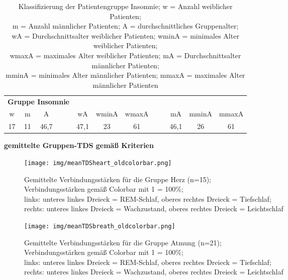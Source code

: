 \begin{table}[H] 
\centering
\begin{tabularx}{0.91\textwidth}{ccccccccccc}
\toprule
\multicolumn{4}{c}{\textbf{Gruppe Insomnie}} & & & & & & &\\  
\cmidrule{1-4}
w  & m  & A    &    & wA   & wminA & wmaxA &    & mA   & mminA & mmaxA\\
\midrule
17 & 11 & 46,7 & ~~ & 47,1 & 23    & 61    & ~~ & 46,1 & 26    & 61\\
\bottomrule
\end{tabularx}
\caption[Gruppe Insomnie]{Klassifizierung der Patientengruppe Insomnie; w = Anzahl weiblicher Patienten;\\m = Anzahl männlicher Patienten; A = durchschnittliches Gruppenalter;\\wA = Durchschnittsalter weiblicher Patienten; wminA = minimales Alter weiblicher Patienten;\\wmaxA = maximales Alter weiblicher Patienten; mA = Durchschnittsalter männlicher Patienten;\\mminA = minimales Alter männlicher Patienten; mmaxA = maximales Alter männlicher Patienten}
\label{tab:Insomnie}
\end{table}



\textbf{gemittelte Gruppen-TDS gemäß Kriterien}

\begin{figure}[H]
	\centering
	\texttt{[image: img/meanTDSheart\_oldcolorbar.png]}
	\caption[Verbindungsstärken für die Gruppe Herz]{Gemittelte Verbindungsstärken für die Gruppe Herz (n=15);\\Verbindungsstärken gemäß Colorbar mit 1 = 100\%;\\links: unteres linkes Dreieck = \acs{REM}-Schlaf, oberes rechtes Dreieck = Tiefschlaf;\\rechts: unteres linkes Dreieck = Wachzustand, oberes rechtes Dreieck = Leichtschlaf}
	\label{fig:meanTDSheart}
\end{figure}

\begin{figure}[H]
	\centering
	\texttt{[image: img/meanTDSbreath\_oldcolorbar.png]}
	\caption[Verbindungsstärken für die Gruppe Atmung]{Gemittelte Verbindungsstärken für die Gruppe Atmung (n=21);\\Verbindungsstärken gemäß Colorbar mit 1 = 100\%;\\links: unteres linkes Dreieck = \acs{REM}-Schlaf, oberes rechtes Dreieck = Tiefschlaf;\\rechts: unteres linkes Dreieck = Wachzustand, oberes rechtes Dreieck = Leichtschlaf}
	\label{fig:meanTDSbreath}
\end{figure}

